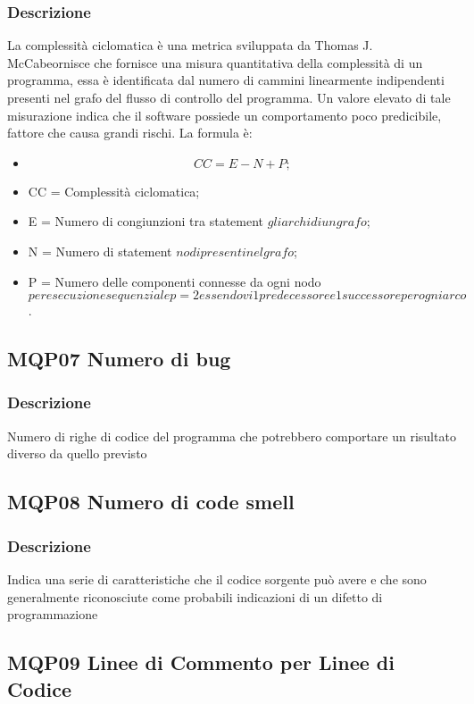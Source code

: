 \documentclass[a4paper]{article}
\begin{document}
\subsubsection{Descrizione}
La complessità ciclomatica è una metrica sviluppata da Thomas J. McCabeornisce che fornisce una misura quantitativa della complessità di un programma, essa è identificata dal numero di cammini linearmente indipendenti presenti nel grafo del flusso di controllo del programma. Un valore elevato di tale misurazione indica che il software possiede un comportamento poco predicibile, fattore che causa grandi rischi.
La formula è:
\begin{itemize}
  \item \[CC 	= E - N + P;\]
  \item CC = Complessità ciclomatica;
  \item E = Numero di congiunzioni tra statement \(gli archi di un grafo\);
  \item N = Numero di statement \(nodi presenti nel grafo\);
  \item P = Numero delle componenti connesse da ogni nodo \(per esecuzione sequenziale p = 2 essendovi 1 predecessore e 1 successore per ogni arco\).
  \end{itemize}


\subsection{MQP07 Numero di bug}
\subsubsection{Descrizione}
Numero di righe di codice del programma che potrebbero comportare un risultato diverso da quello previsto

\subsection{MQP08 Numero di code smell}
\subsubsection{Descrizione}
Indica una serie di caratteristiche che il codice sorgente può avere e che sono generalmente riconosciute come probabili indicazioni di un difetto di programmazione

\subsection{MQP09 Linee di Commento per Linee di Codice}
\end{document}
